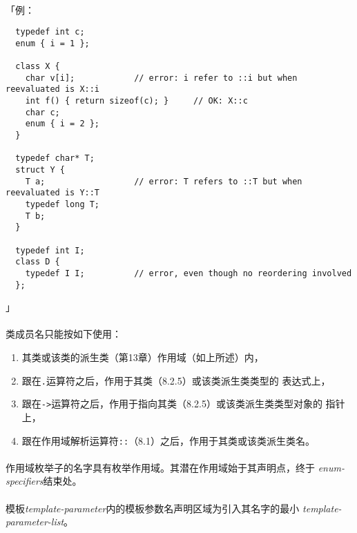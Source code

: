 \paragraph{}
「例：
\begin{lstlisting}
  typedef int c;
  enum { i = 1 };

  class X {
    char v[i];            // error: i refer to ::i but when reevaluated is X::i
    int f() { return sizeof(c); }     // OK: X::c
    char c;
    enum { i = 2 };
  }

  typedef char* T;
  struct Y {
    T a;                  // error: T refers to ::T but when reevaluated is Y::T
    typedef long T;
    T b;
  }

  typedef int I;
  class D {
    typedef I I;          // error, even though no reordering involved
  };
\end{lstlisting}」

\paragraph{}
类成员名只能按如下使用：
\begin{enumerate}
  \item{其类或该类的派生类（第13章）作用域（如上所述）内，}
  \item{跟在\texttt{.}运算符之后，作用于其类（8.2.5）或该类派生类类型的
    表达式上，}
  \item{跟在\texttt{->}运算符之后，作用于指向其类（8.2.5）或该类派生类类型对象的
    指针上，}
  \item{跟在作用域解析运算符\texttt{::}（8.1）之后，作用于其类或该类派生类名。}
\end{enumerate}

\paragraph{}
作用域枚举子的名字具有枚举作用域。其潜在作用域始于其声明点，终于
\textit{enum-specifiers}结束处。

\paragraph{}
模板\textit{template-parameter}内的模板参数名声明区域为引入其名字的最小
\textit{template-parameter-list}。


